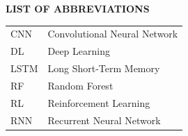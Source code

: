 
\clearpage
\begin{center}
    \textbf{\Large LIST OF ABBREVIATIONS}
\end{center}


\begin{longtable}{@{}ll@{}}
CNN                 & Convolutional Neural Network \\
DL                  & Deep Learning \\
LSTM                & Long Short-Term Memory \\
RF                  & Random Forest \\
RL                  & Reinforcement Learning \\
RNN                 & Recurrent Neural Network \\
\end{longtable}